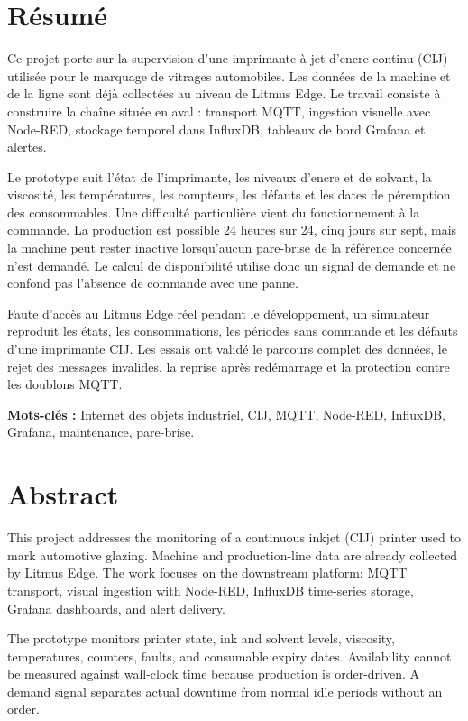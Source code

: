 \documentclass[12pt,a4paper,oneside]{report}
\begin{document}
\chapter*{Résumé}
Ce projet porte sur la supervision d'une imprimante à jet d'encre continu
(CIJ) utilisée pour le marquage de vitrages automobiles. Les données de la
machine et de la ligne sont déjà collectées au niveau de Litmus Edge. Le
travail consiste à construire la chaîne située en aval : transport MQTT,
ingestion visuelle avec Node-RED, stockage temporel dans InfluxDB, tableaux de bord
Grafana et alertes.

Le prototype suit l'état de l'imprimante, les niveaux d'encre et de solvant, la
viscosité, les températures, les compteurs, les défauts et les dates de
péremption des consommables. Une difficulté particulière vient du
fonctionnement à la commande. La production est possible 24 heures sur 24,
cinq jours sur sept, mais la machine peut rester inactive lorsqu'aucun
pare-brise de la référence concernée n'est demandé. Le calcul de disponibilité
utilise donc un signal de demande et ne confond pas l'absence de commande avec
une panne.

Faute d'accès au Litmus Edge réel pendant le développement, un simulateur
reproduit les états, les consommations, les périodes sans commande et les
défauts d'une imprimante CIJ. Les essais ont validé le parcours complet des
données, le rejet des messages invalides, la reprise après redémarrage et la
protection contre les doublons MQTT.

\noindent\textbf{Mots-clés :} Internet des objets industriel, CIJ, MQTT,
Node-RED, InfluxDB, Grafana, maintenance, pare-brise.

\chapter*{Abstract}
This project addresses the monitoring of a continuous inkjet (CIJ) printer
used to mark automotive glazing. Machine and production-line data are already
collected by Litmus Edge. The work focuses on the downstream platform: MQTT
transport, visual ingestion with Node-RED, InfluxDB time-series storage, Grafana
dashboards, and alert delivery.

The prototype monitors printer state, ink and solvent levels, viscosity,
temperatures, counters, faults, and consumable expiry dates. Availability
cannot be measured against wall-clock time because production is order-driven.
A demand signal separates actual downtime from normal idle periods without an
order.
\end{document}
